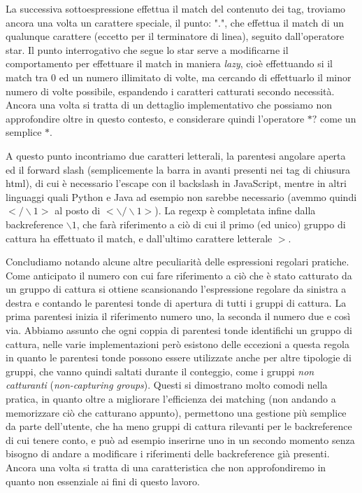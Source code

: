 \begin{esempio}
	La successiva sottoespressione effettua il match del contenuto dei tag, troviamo ancora una volta un carattere speciale, il punto: "$.$", che effettua il match di un qualunque carattere (eccetto per il terminatore di linea), seguito dall'operatore star. Il punto interrogativo che segue lo star serve a modificarne il comportamento per effettuare il match in maniera \textit{lazy}, cioè effettuando si il match tra 0 ed un numero illimitato di volte, ma cercando di effettuarlo il minor numero di volte possibile, espandendo i caratteri catturati secondo necessità. Ancora una volta si tratta di un dettaglio implementativo che possiamo non approfondire oltre in questo contesto, e considerare quindi l'operatore $*?$ come un semplice $*$.
	
	A questo punto incontriamo due caratteri letterali, la parentesi angolare aperta ed il forward slash (semplicemente la barra in avanti presenti nei tag di chiusura html), di cui è necessario l'escape con il backslash in JavaScript, mentre in altri linguaggi quali Python e Java ad esempio non sarebbe necessario (avemmo quindi $</\backslash 1>$ al posto di $<\backslash/\backslash1>$). La regexp è completata infine dalla backreference $\backslash1$, che farà riferimento a ciò di cui il primo (ed unico) gruppo di cattura ha effettuato il match, e dall'ultimo carattere letterale $>$.
\end{esempio}

Concludiamo notando alcune altre peculiarità delle espressioni regolari pratiche. Come anticipato il numero con cui fare riferimento a ciò che è stato catturato da un gruppo di cattura si ottiene scansionando l'espressione regolare da sinistra a destra e contando le parentesi tonde di apertura di tutti i gruppi di cattura. La prima parentesi inizia il riferimento numero uno, la seconda il numero due e così via. Abbiamo assunto che ogni coppia di parentesi tonde identifichi un gruppo di cattura, nelle varie implementazioni però esistono delle eccezioni a questa regola in quanto le parentesi tonde possono essere utilizzate anche per altre tipologie di gruppi, che vanno quindi saltati durante il conteggio, come i gruppi \textit{non catturanti} (\foreignlanguage{english}{\textit{non-capturing groups}}). Questi si dimostrano molto comodi nella pratica, in quanto oltre a migliorare l'efficienza dei matching (non andando a memorizzare ciò che catturano appunto), permettono una gestione più semplice da parte dell'utente, che ha meno gruppi di cattura rilevanti per le backreference di cui tenere conto, e può ad esempio inserirne uno in un secondo momento senza bisogno di andare a modificare i riferimenti delle backreference già presenti. Ancora una volta si tratta di una caratteristica che non approfondiremo in quanto non essenziale ai fini di questo lavoro.

